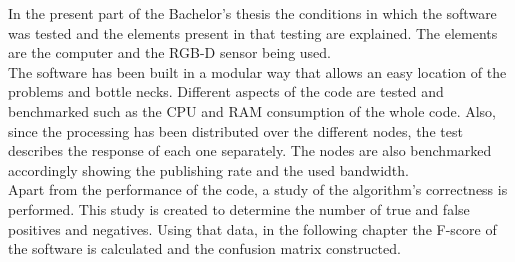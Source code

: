 
In the present part of the Bachelor's thesis the conditions in which the software was tested and the elements present in that testing are explained. The elements are the computer and the RGB-D sensor being used. \\[0.5cm]

The software has been built in a modular way that allows an easy location of the problems and bottle necks.
Different aspects of the code are tested and benchmarked such as the CPU and RAM consumption of the whole code. Also, since the processing has been distributed over the different nodes, the test describes the response of each one separately. 
The nodes are also benchmarked accordingly showing the publishing rate and the used bandwidth. 
\\[0.5cm]


Apart from the performance of the code, a study of the algorithm's correctness is performed. This study is created to determine the number of true and false positives and negatives. Using that data, in the following chapter the F-score of the software is calculated and the confusion matrix constructed. \\[0.5cm]



